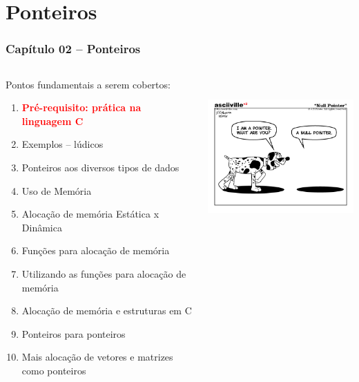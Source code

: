 
\section{Ponteiros}

\begin{frame}[allowframebreaks=0.7]

\frametitle{\Large Capítulo 02 -- Ponteiros}
\begin{columns}
\begin{column}{.4\textwidth}
\centering
Pontos fundamentais a serem cobertos:
  
  \begin{small}
  \begin{enumerate}
  \item \textbf{\textcolor{red}{Pré-requisito: prática na linguagem C}}
  \item Exemplos -- lúdicos
  \item Ponteiros aos diversos tipos de dados
  \item Uso de Memória
  \item Alocação de memória Estática x Dinâmica
  \item  Funções para alocação de memória
  \item  Utilizando as funções para alocação de memória
  \item  Alocação de memória e estruturas em C
  \item  Ponteiros para ponteiros
  \item Mais alocação de vetores e matrizes como ponteiros
\end{enumerate}  
  \end{small}
  
\end{column}

\begin{column}{.6\textwidth}
\vskip -1.5cm

\includegraphics[height=6cm, width=7cm]{figs/fig_ponteiros/nulo-pointer.png}
\end{column}

\end{columns}

\end{frame}



